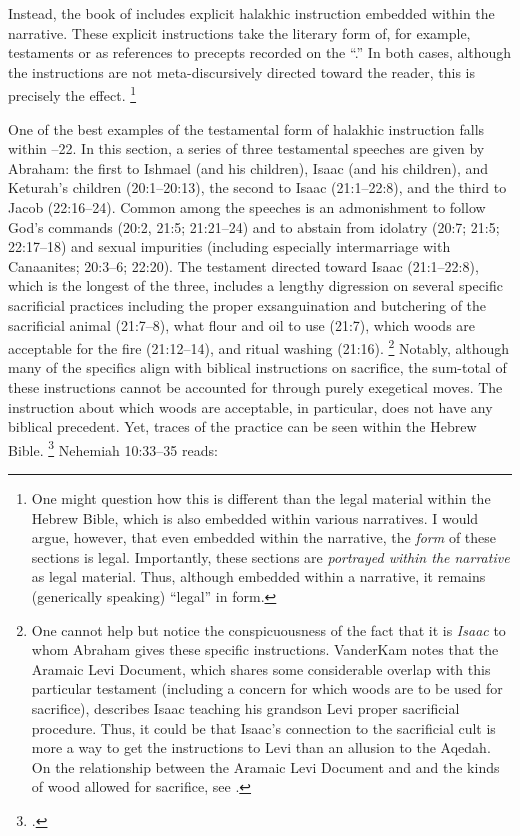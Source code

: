 Instead, the book of \jub includes explicit halakhic instruction embedded within the narrative. These explicit instructions take the literary form of, for example, testaments or as references to precepts recorded on the ``\heavenlytablets.'' In both cases, although the instructions are not meta-discursively directed toward the reader, this is precisely the effect.%
    \footnote{One might question how this is different than the legal material within the Hebrew Bible, which is also embedded within various narratives. I would argue, however, that even embedded within the narrative, the \emph{form} of these sections is legal. Importantly, these sections are \emph{portrayed within the narrative} as legal material. Thus, although embedded within a narrative, it remains (generically speaking) ``legal'' in form.}

One of the best examples of the testamental form of halakhic instruction falls within --22. In this section, a series of three testamental speeches are given by Abraham: the first to Ishmael (and his children), Isaac (and his children), and Keturah's children (20:1--20:13), the second to Isaac (21:1--22:8), and the third to Jacob (22:16--24). Common among the speeches is an admonishment to follow God's commands (20:2, 21:5; 21:21--24) and to abstain from idolatry (20:7; 21:5; 22:17--18) and sexual impurities (including especially intermarriage with Canaanites; 20:3--6; 22:20). The testament directed toward Isaac (21:1--22:8), which is the longest of the three, includes a lengthy digression on several specific sacrificial practices including the proper exsanguination and butchering of the sacrificial animal (21:7--8), what flour and oil to use (21:7), which woods are acceptable for the fire (21:12--14), and ritual washing (21:16).%
    \footnote{One cannot help but notice the conspicuousness of the fact that it is \emph{Isaac} to whom Abraham gives these specific instructions. VanderKam notes that the Aramaic Levi Document, which shares some considerable overlap with this particular testament (including a concern for which woods are to be used for sacrifice), describes Isaac teaching his grandson Levi proper sacrificial procedure. Thus, it could be that Isaac's connection to the sacrificial cult is more a way to get the instructions to Levi than an allusion to the Aqedah. On the relationship between the Aramaic Levi Document and \jub and the kinds of wood allowed for sacrifice, see \cite[625, 636--639]{vanderkam2018}.}
Notably, although many of the specifics align with biblical instructions on sacrifice, the sum-total of these instructions cannot be accounted for through purely exegetical moves. The instruction about which woods are acceptable, in particular, does not have any biblical precedent. Yet, traces of the practice can be seen within the Hebrew Bible.%
    \footnote{\cite[]{vanderkam2018}.}
Nehemiah 10:33--35 reads:


